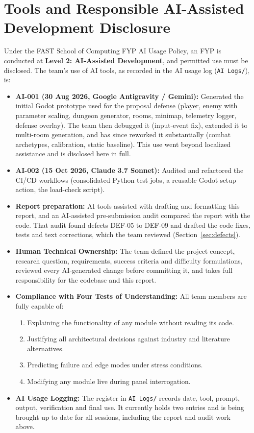 \section{Tools and Responsible AI-Assisted Development Disclosure}\label{sec:ai_disclosure}
Under the FAST School of Computing FYP AI Usage Policy, an FYP is conducted at \textbf{Level 2: AI-Assisted Development}, and permitted use must be disclosed. The team's use of AI tools, as recorded in the AI usage log (\texttt{AI Logs/}), is:
\begin{itemize}
    \item \textbf{AI-001 (30 Aug 2026, Google Antigravity / Gemini):} Generated the initial Godot prototype used for the proposal defense (player, enemy with parameter scaling, dungeon generator, rooms, minimap, telemetry logger, defense overlay). The team then debugged it (input-event fix), extended it to multi-room generation, and has since reworked it substantially (combat archetypes, calibration, static baseline). This use went beyond localized assistance and is disclosed here in full.
    \item \textbf{AI-002 (15 Oct 2026, Claude 3.7 Sonnet):} Audited and refactored the CI/CD workflows (consolidated Python test jobs, a reusable Godot setup action, the load-check script).
    \item \textbf{Report preparation:} AI tools assisted with drafting and formatting this report, and an AI-assisted pre-submission audit compared the report with the code. That audit found defects DEF-05 to DEF-09 and drafted the code fixes, tests and text corrections, which the team reviewed (Section~\ref{sec:defects}).
    \item \textbf{Human Technical Ownership:} The team defined the project concept, research question, requirements, success criteria and difficulty formulations, reviewed every AI-generated change before committing it, and takes full responsibility for the codebase and this report.
    \item \textbf{Compliance with Four Tests of Understanding:} All team members are fully capable of:
    \begin{enumerate}
        \item Explaining the functionality of any module without reading its code.
        \item Justifying all architectural decisions against industry and literature alternatives.
        \item Predicting failure and edge modes under stress conditions.
        \item Modifying any module live during panel interrogation.
    \end{enumerate}
    \item \textbf{AI Usage Logging:} The register in \texttt{AI Logs/} records date, tool, prompt, output, verification and final use. It currently holds two entries and is being brought up to date for all sessions, including the report and audit work above.
\end{itemize}

